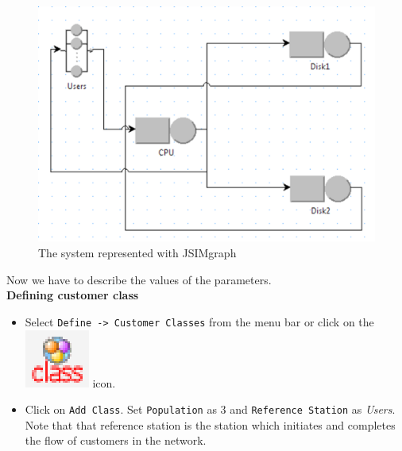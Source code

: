 \begin{figure}[htb]
    \begin{center}
        \includegraphics[scale=.5]{img/jsimg/12.2.eps}
    \end{center}
    \caption{The system represented with JSIMgraph}
    \label{fig:ex1repr}
\end{figure}
Now we have to describe the values of the parameters.\\

\noindent \textbf{Defining customer class} \begin{itemize} \item
Select \texttt{Define -> Customer Classes} from the menu bar or
click on the
\includegraphics[scale=.5]{img/jsimg/definecustclasses.eps}
icon. \item Click on \texttt{Add Class}. Set \texttt{Population}
as 3 and \texttt{Reference Station} as \emph{Users}. Note that
that reference station is the station which initiates and
completes the flow of customers in the network.
\end{itemize}

